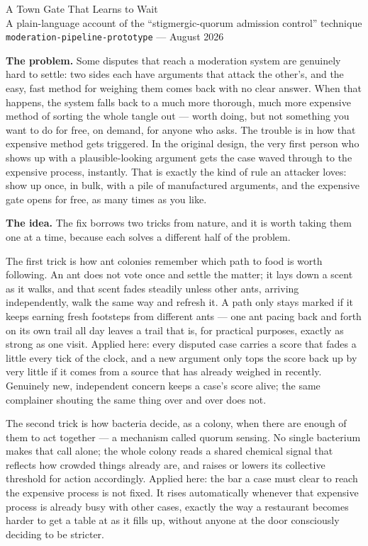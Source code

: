 \documentclass[11pt]{article}
\begin{document}
\begin{center}
{\LARGE A Town Gate That Learns to Wait}\\[0.6em]
{\large A plain-language account of the ``stigmergic-quorum admission
control'' technique}\\[0.3em]
{\small \texttt{moderation-pipeline-prototype} --- August 2026}
\end{center}

\vspace{1em}

\textbf{The problem.} Some disputes that reach a moderation system are
genuinely hard to settle: two sides each have arguments that attack the
other's, and the easy, fast method for weighing them comes back with no
clear answer. When that happens, the system falls back to a much more
thorough, much more expensive method of sorting the whole tangle out ---
worth doing, but not something you want to do for free, on demand,
for anyone who asks. The trouble is in how that expensive method gets
triggered. In the original design, the very first person who shows up
with a plausible-looking argument gets the case waved through to the
expensive process, instantly. That is exactly the kind of rule an
attacker loves: show up once, in bulk, with a pile of manufactured
arguments, and the expensive gate opens for free, as many times as you
like.

\textbf{The idea.} The fix borrows two tricks from nature, and it is
worth taking them one at a time, because each solves a different half
of the problem.

The first trick is how ant colonies remember which path to food is
worth following. An ant does not vote once and settle the matter; it
lays down a scent as it walks, and that scent fades steadily unless
other ants, arriving independently, walk the same way and refresh it. A
path only stays marked if it keeps earning fresh footsteps from
different ants --- one ant pacing back and forth on its own trail all
day leaves a trail that is, for practical purposes, exactly as strong as
one visit. Applied here: every disputed case carries a score that fades
a little every tick of the clock, and a new argument only tops the score
back up by very little if it comes from a source that has already
weighed in recently. Genuinely new, independent concern keeps a
case's score alive; the same complainer shouting the same thing over and
over does not.

The second trick is how bacteria decide, as a colony, when there are
enough of them to act together --- a mechanism called quorum sensing.
No single bacterium makes that call alone; the whole colony reads a
shared chemical signal that reflects how crowded things already are, and
raises or lowers its collective threshold for action accordingly.
Applied here: the bar a case must clear to reach the expensive process
is not fixed. It rises automatically whenever that expensive process is
already busy with other cases, exactly the way a restaurant becomes
harder to get a table at as it fills up, without anyone at the door
consciously deciding to be stricter.
\end{document}
